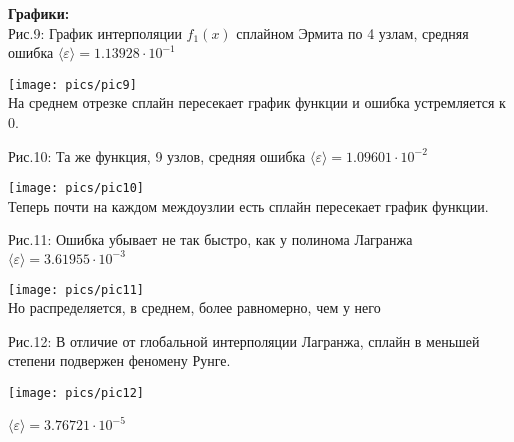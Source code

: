 \documentclass[a4paper, 14pt]{article}
\begin{document}
{{\huge{\textbf{Графики:}}}\\[-0.5cm]
{\normalsize Рис.9: График интерполяции $f_1(x)$ сплайном Эрмита по 4 узлам, средняя ошибка  $\langle\varepsilon\rangle=1.13928\cdot10^{-1}$}
\begin{center}
    \texttt{[image: pics/pic9]}\\
    \vspace{-0.7cm}
    {\small На среднем отрезке сплайн пересекает график функции и ошибка устремляется к $0$.}
\end{center}

\vspace{-0.5cm}
{\normalsize Рис.10: Та же функция, 9 узлов, средняя ошибка $\langle\varepsilon\rangle=1.09601\cdot10^{-2}$}
\begin{center}
    \texttt{[image: pics/pic10]}\\
    \vspace{-0.7cm}
    {\small Теперь почти на каждом междоузлии есть сплайн пересекает график функции.}
\end{center}


\newpage
{\normalsize Рис.11: Ошибка убывает не так быстро, как у полинома Лагранжа $\langle\varepsilon\rangle=3.61955\cdot10^{-3}$}
\begin{center}
    \texttt{[image: pics/pic11]}\\
    \vspace{-0.7cm}
    {\small Но распределяется, в среднем, более равномерно, чем у него}
\end{center}
\vspace{-0.7cm}
{\normalsize Рис.12: В отличие от глобальной интерполяции Лагранжа, сплайн в меньшей степени подвержен феномену Рунге.}
\begin{center}
    \texttt{[image: pics/pic12]}
    \vspace{-0.7cm}
\end{center}

{\small $\langle\varepsilon\rangle=3.76721\cdot10^{-5}$}


}
\end{document}
